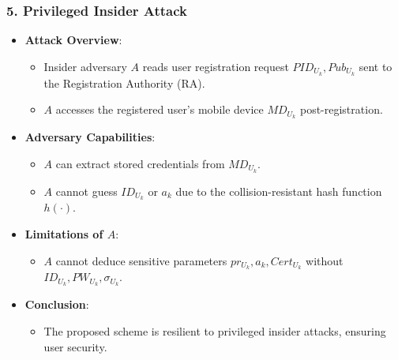 \documentclass[9pt,handout]{beamer}
\begin{document}
\begin{frame}
    \frametitle{5. Privileged Insider Attack}
    \begin{itemize}
        \item \textbf{Attack Overview}:
            \begin{itemize}
                \item Insider adversary \( A \) reads user registration request \( PID_{U_k}, Pub_{U_k} \) sent to the Registration Authority (RA).
                \item \( A \) accesses the registered user’s mobile device \( MD_{U_k} \) post-registration.
            \end{itemize}
        \item \textbf{Adversary Capabilities}:
            \begin{itemize}
                \item \( A \) can extract stored credentials from \( MD_{U_k} \).
                \item \( A \) cannot guess \( ID_{U_k} \) or \( a_k \) due to the collision-resistant hash function \( h(\cdot) \).
            \end{itemize}
        \item \textbf{Limitations of \( A \)}:
            \begin{itemize}
                \item \( A \) cannot deduce sensitive parameters \( pr_{U_k}, a_k, Cert_{U_k} \) without \( ID_{U_k}, PW_{U_k}, \sigma_{U_k} \).
            \end{itemize}
        \item \textbf{Conclusion}:
            \begin{itemize}
                \item The proposed scheme is resilient to privileged insider attacks, ensuring user security.
            \end{itemize}
    \end{itemize}
\end{frame}
\end{document}

